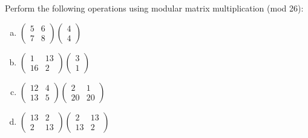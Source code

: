 \begin{exercise}{}
Perform the following operations using modular matrix multiplication (mod 26):
\begin{multicols}{2}
\begin{enumerate}[(a)]
\item
$\left(
\begin{array}{cc}
5 & 6 \\
7 & 8
\end{array}
\right)
\left(
\begin{array}{c}
4 \\
4
\end{array}
\right)$
\item
$\left(
\begin{array}{cc}
1 & 13 \\
16 & 2
\end{array}
\right)
\left(
\begin{array}{c}
3 \\
1
\end{array}
\right)$
\item
$\left(
\begin{array}{cc}
12 & 4 \\
13 & 5
\end{array}
\right)
\left(
\begin{array}{cc}
2 &1 \\
20 & 20 
\end{array}
\right)$
\item
$\left(
\begin{array}{cc}
13 & 2 \\
2 & 13
\end{array}
\right)
\left(
\begin{array}{cc}
2 &13 \\
13 & 2 
\end{array}
\right)$
\end{enumerate}
\end{multicols}
\end{exercise} 
 
